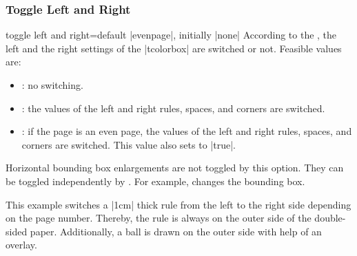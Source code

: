 {\tcbusetemp}


\clearpage
\subsubsection{Toggle Left and Right}
\begin{docTcbKey}[][doc updated=2017-02-16]{toggle left and right}{=}{default |evenpage|, initially |none|}
  According to the , the left and the right settings
  of the |tcolorbox| are switched or not. Feasible values are:
  \begin{itemize}
  \item{}: no switching.
  \item{}: the values of the left and right rules, spaces, and corners are switched.
  \item{}: if the page is an even page, the values of the left and
    right rules, spaces, and corners are switched. This value also sets
     to |true|.
  \end{itemize}
\begin{marker}
Horizontal bounding box enlargements are not toggled by this option.
They can be toggled independently by .
For example,  changes the bounding box.
\end{marker}
\begin{dispListing}
\begin{tcolorbox}[enhanced,breakable,
  toggle left and right,sharp corners,
  boxrule=0mm,top=0mm,bottom=0mm,left=1mm,right=1mm,
  rightrule=1cm,colupper=blue!25!black,
  interior style={fill overzoom image=lichtspiel.jpg,fill image opacity=0.25},
  frame style={pattern=crosshatch dots light steel blue},
  overlay={%
    \begin{tcbclipframe}
    \tcbifoddpage{\coordinate (X) at ([xshift=-5mm]frame.east);}
                 {\coordinate (X) at ([xshift=5mm]frame.west);}
    \fill[shading=ball,ball color=blue!50!white,opacity=0.5] (X) circle (4mm);
    \end{tcbclipframe}}]
\lipsum[1-6]
\end{tcolorbox}
\end{dispListing}
\medskip

This example switches a |1cm| thick rule from the left to the right side
depending on the page number. Thereby, the rule is always on the outer side
of the double-sided paper. Additionally, a ball is drawn on the outer side
with help of an overlay.
\bigskip

\tcbusetemp
\end{docTcbKey}

